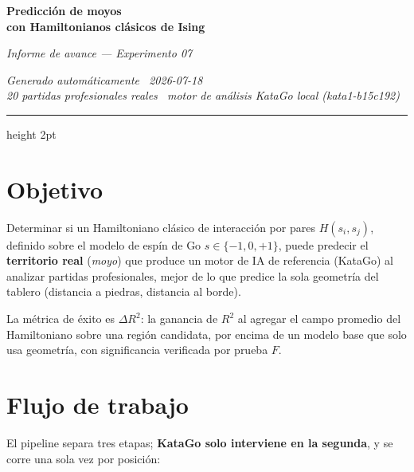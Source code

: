 \documentclass[11pt, a4paper]{article}
\begin{document}
\thispagestyle{fancy}

\vspace*{4pt}
{\color{cNavy}\Huge\bfseries Predicci\'on de moyos}\\[3pt]
{\color{cNavy}\Large\bfseries con Hamiltonianos cl\'asicos de Ising}

\vspace{6pt}
{\color{cMuted}\large\itshape
  Informe de avance --- Experimento 07}

\vspace{4pt}
{\color{cMuted}\small\itshape Generado autom\'aticamente \textbullet\ 2026-07-18}\\[1pt]
{\color{cMuted}\small\itshape
  20 partidas profesionales reales \textbullet\ motor de an\'alisis KataGo local
  (kata1-b15c192)}

\vspace{8pt}
{\color{cAccent}\hrule height 2pt}
\vspace{10pt}

\section{Objetivo}

Determinar si un Hamiltoniano cl\'asico de interacci\'on por pares
$H(s_i,s_j)$, definido sobre el modelo de esp\'in de Go
$s\in\{-1,0,+1\}$, puede predecir el \textbf{territorio real} (\emph{moyo})
que produce un motor de IA de referencia (KataGo) al analizar partidas
profesionales, mejor de lo que predice la sola geometr\'ia del tablero
(distancia a piedras, distancia al borde).

La m\'etrica de \'exito es $\Delta R^2$: la ganancia de $R^2$ al agregar
el campo promedio del Hamiltoniano sobre una regi\'on candidata,
por encima de un modelo base que solo usa geometr\'ia, con significancia
verificada por prueba $F$.

\section{Flujo de trabajo}

El pipeline separa tres etapas; \textbf{KataGo solo interviene en la
segunda}, y se corre una sola vez por posici\'on:
\end{document}
